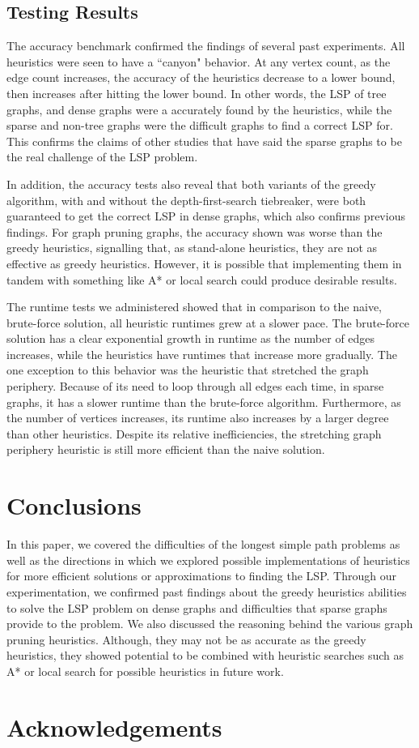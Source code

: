 \documentclass[twocolumn,showpacs,%
  nofootinbib,aps,superscriptaddress,%
  eqsecnum,prd,notitlepage,showkeys,11pt]{article}
\begin{document}
\subsection{Testing Results}
The accuracy benchmark confirmed the findings of several past experiments. All heuristics were seen to have a ``canyon" behavior. At any vertex count, as the edge count increases, the accuracy of the heuristics decrease to a lower bound, then increases after hitting the lower bound. In other words, the LSP of tree graphs, and dense graphs were a accurately found by the heuristics, while the sparse and non-tree graphs were the difficult graphs to find a correct LSP for. This confirms the claims of other studies that have said the sparse graphs to be the real challenge of the LSP problem. 

In addition, the accuracy tests also reveal that both variants of the greedy algorithm, with and without the depth-first-search tiebreaker, were both guaranteed to get the correct LSP in dense graphs, which also confirms previous findings. For graph pruning graphs, the accuracy shown was worse than the greedy heuristics, signalling that, as stand-alone heuristics, they are not as effective as greedy heuristics. However, it is possible that implementing them in tandem with something like A* or local search could produce desirable results.

The runtime tests we administered showed that in comparison to the naive, brute-force solution, all heuristic runtimes grew at a slower pace. The brute-force solution has a clear exponential growth in runtime as the number of edges increases, while the heuristics have runtimes that increase more gradually. The one exception to this behavior was the heuristic that stretched the graph periphery. Because of its need to loop through all edges each time, in sparse graphs, it has a slower runtime than the brute-force algorithm. Furthermore, as the number of vertices increases, its runtime also increases by a larger degree than other heuristics. Despite its relative inefficiencies, the stretching graph periphery heuristic is still more efficient than the naive solution.

\section{\centering Conclusions}
In this paper, we covered the difficulties of the longest simple path problems as well as the directions in which we explored possible implementations of heuristics for more efficient solutions or approximations to finding the LSP. Through our experimentation, we confirmed past findings about the greedy heuristics abilities to solve the LSP problem on dense graphs and difficulties that sparse graphs provide to the problem. We also discussed the reasoning behind the various graph pruning heuristics. Although, they may not be as accurate as the greedy heuristics, they showed potential to be combined with heuristic searches such as A* or local search for possible heuristics in future work.

\section*{Acknowledgements}



\end{document}
